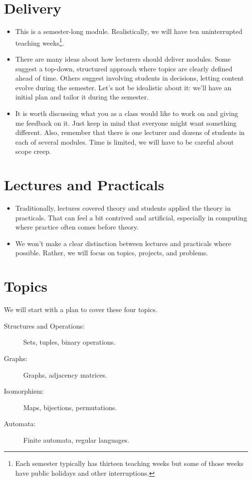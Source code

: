\documentclass{iansnotes}
\begin{document}
\section{Delivery}
\begin{itemize}
  \item This is a semester-long module. Realistically, we will have ten uninterrupted teaching weeks\footnote{Each semester typically has thirteen teaching weeks but some of those weeks have public holidays and other interruptions.}.
  \item There are many ideas about how lecturers should deliver modules. Some suggest a top-down, structured approach where topics are clearly defined ahead of time. Others suggest involving students in decisions, letting content evolve during the semester. Let's not be idealistic about it: we'll have an initial plan and tailor it during the semester.
  \item It is worth discussing what you as a class would like to work on and giving me feedback on it. Just keep in mind that everyone might want something different. Also, remember that there is one lecturer and dozens of students in each of several modules. Time is limited, we will have to be careful about scope creep.
\end{itemize}

 
\section{Lectures and Practicals}
\begin{itemize}
  \item Traditionally, lectures covered theory and students applied the theory in practicals. That can feel a bit contrived and artificial, especially in computing where practice often comes before theory.
  \item We won't make a clear distinction between lectures and practicals where possible. Rather, we will focus on topics, projects, and problems.
\end{itemize}


\section{Topics}
We will start with a plan to cover these four topics.

\begin{description}
  \item[Structures and Operations:] Sets, tuples, binary operations.
  \item[Graphs:] Graphs, adjacency matrices.
  \item[Isomorphism:] Maps, bijections, permutations.
  \item[Automata:] Finite automata, regular languages.
\end{description}
\end{document}
